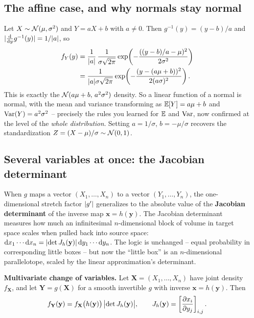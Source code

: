 \subsection{The affine case, and why normals stay normal}

\begin{example}
\label{ch16:affine-normal}
Let $X \sim \Normal(\mu,\sigma^2)$ and $Y = aX + b$ with $a \ne 0$. Then
$g^{-1}(y) = (y-b)/a$ and $\abs{\tfrac{\dd}{\dd y}g^{-1}(y)} = 1/\abs{a}$, so
\begin{align*}
  f_Y(y) &= \frac{1}{\abs{a}}\,
            \frac{1}{\sigma\sqrt{2\pi}}\exp\!\left(-\frac{((y-b)/a-\mu)^2}{2\sigma^2}\right) \\
         &= \frac{1}{\abs{a}\sigma\sqrt{2\pi}}
            \exp\!\left(-\frac{(y-(a\mu+b))^2}{2(a\sigma)^2}\right).
\end{align*}
This is exactly the $\Normal(a\mu+b,\, a^2\sigma^2)$ density. So a linear function of a
normal is normal, with the mean and variance transforming as $\E[Y]=a\mu+b$ and
$\Var(Y)=a^2\sigma^2$ -- precisely the rules you learned for $\E$ and $\Var$, now confirmed
at the level of the \emph{whole distribution}. Setting $a=1/\sigma$, $b=-\mu/\sigma$
recovers the standardization $Z=(X-\mu)/\sigma \sim \Normal(0,1)$.
\end{example}

\subsection{Several variables at once: the Jacobian determinant}

When $g$ maps a vector $(X_1,\dots,X_n)$ to a vector $(Y_1,\dots,Y_n)$, the one-dimensional
stretch factor $\abs{g'}$ generalizes to the absolute value of the \textbf{Jacobian determinant}
of the inverse map $\mathbf{x} = h(\mathbf{y})$. The Jacobian determinant measures how much an
infinitesimal $n$-dimensional block of volume in target space scales when pulled back into source
space: $\dd x_1\cdots\dd x_n = \abs{\det J_h(\mathbf y)}\,\dd y_1\cdots\dd y_n$. The logic is
unchanged -- equal probability in corresponding little boxes -- but now the ``little box'' is
an $n$-dimensional parallelotope, scaled by the linear approximation's determinant.

\begin{formalbox}
\textbf{Multivariate change of variables.} Let $\mathbf{X}=(X_1,\dots,X_n)$ have joint
density $f_{\mathbf X}$, and let $\mathbf Y = g(\mathbf X)$ for a smooth invertible $g$
with inverse $\mathbf x = h(\mathbf y)$. Then
\[
  f_{\mathbf Y}(\mathbf y)
  = f_{\mathbf X}\big(h(\mathbf y)\big)\,\abs[\big]{\det J_h(\mathbf y)},
  \qquad
  J_h(\mathbf y) = \left[\frac{\partial x_i}{\partial y_j}\right]_{i,j}.
\]
\end{formalbox}

